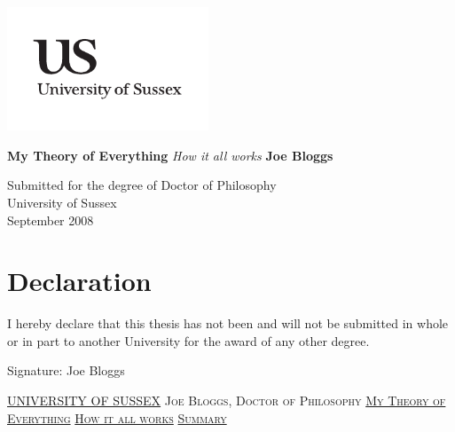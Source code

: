 \documentclass[a4paper,11pt]{report}
\newcommand{\linespacing}{1.5}
\renewcommand{\baselinestretch}{\linespacing}
\begin{document}




\thispagestyle{empty}
\begin{flushright}
\includegraphics[width=6cm]{fig/uslogo.pdf}
\end{flushright}	
\vskip40mm
\begin{center}
\huge\textbf{My Theory of Everything}
\vskip2mm
\LARGE\textit{How it all works}
\vskip5mm
\Large\textbf{Joe Bloggs}
\normalsize
\end{center}
\vfill
\begin{flushleft}
\large
Submitted for the degree of Doctor of Philosophy \\
University of Sussex	\\
September 2008
\end{flushleft}		


\chapter*{Declaration}
I hereby declare that this thesis has not been and will not be submitted in whole or in part to another University for the award of any other degree.
	

\vskip5mm
Signature:
\vskip20mm
Joe Bloggs


\thispagestyle{empty}
\newpage
\null\vskip10mm
\begin{center}
\large
\underline{UNIVERSITY OF SUSSEX}
\vskip20mm
\textsc{Joe Bloggs, Doctor of Philosophy}
\vskip20mm
\underline{\textsc{My Theory of Everything}}
\vskip0mm
\underline{\textsc{How it all works}}
\vskip20mm
\underline{\textsc{Summary}}
\vskip2mm
\end{center}
\renewcommand{\baselinestretch}{1.0}
\small\normalsize
\end{document}
